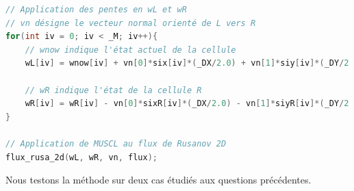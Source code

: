 \documentclass[
	french,
	11pt, %
]{fphw}
\begin{document}
\begin{lstlisting}[language=C, caption={Application de la méthode MSUCL au flux de Rusanov},breaklines]
// Application des pentes en wL et wR 
// vn désigne le vecteur normal orienté de L vers R
for(int iv = 0; iv < _M; iv++){
	// wnow indique l'état actuel de la cellule
	wL[iv] = wnow[iv] + vn[0]*six[iv]*(_DX/2.0) + vn[1]*siy[iv]*(_DY/2.0) + ri[iv]*(_DT/2.0);

	// wR indique l'état de la cellule R
	wR[iv] = wR[iv] - vn[0]*sixR[iv]*(_DX/2.0) - vn[1]*siyR[iv]*(_DY/2.0) + riR[iv]*(_DT/2.0);
}  

// Application de MUSCL au flux de Rusanov 2D
flux_rusa_2d(wL, wR, vn, flux);                      
\end{lstlisting}

Nous testons la méthode sur deux cas étudiés aux questions précédentes.
\end{document}
